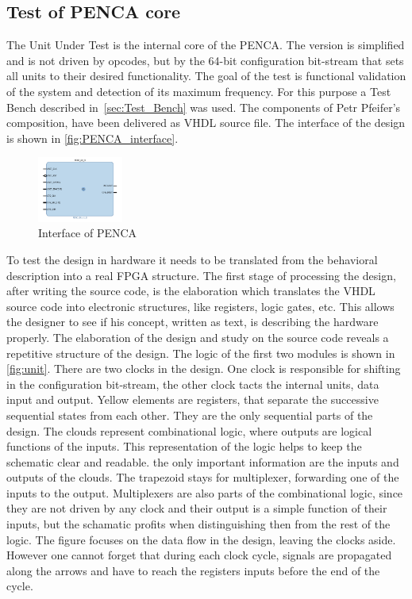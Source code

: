 \subsection{Test of PENCA core}
The Unit Under Test is the internal core of the PENCA. The version is simplified and is not driven by opcodes, but by the 64-bit configuration bit-stream that sets all units to their desired functionality. The goal of the test is functional validation of the system and detection of its maximum frequency. For this purpose a Test Bench described in~\autoref{sec:Test_Bench} was used.
The components of Petr Pfeifer's composition, have been delivered as VHDL source file. The interface of the design is shown in \autoref{fig:PENCA_interface}.

\begin{figure}[h]
\centering
\includegraphics[width=0.25\textwidth]{figures/PENCA_interface.PNG}
\caption{Interface of PENCA}
\label{fig:PENCA_interface}
\end{figure}

To test the design in hardware it needs to be translated from the behavioral description into a real FPGA structure. The first stage of processing the design, after writing the source code, is the elaboration which translates the VHDL source code into electronic structures, like registers, logic gates, etc. This allows the designer to see if his concept, written as text, is describing the hardware properly.
The elaboration of the design and study on the source code reveals a repetitive structure of the design. The logic of the first two modules is shown in \autoref{fig:unit}. There are two clocks in the design. One clock is responsible for shifting in the configuration bit-stream, the other clock tacts the internal units, data input and output. Yellow elements are registers, that separate the successive sequential states from each other. They are the only sequential parts of the design. The clouds represent combinational logic, where outputs are logical functions of the inputs. This representation of the logic helps to keep the schematic clear and readable. the only important information are the inputs and outputs of the clouds. The trapezoid stays for multiplexer, forwarding one of the inputs to the output. Multiplexers are also parts of the combinational logic, since they are not driven by any clock and their output is a simple function of their inputs, but the schamatic profits when distinguishing then from the rest of the logic. The figure focuses on the data flow in the design, leaving the clocks aside. However one cannot forget that during each clock cycle, signals are propagated along the arrows and have to reach the registers inputs before the end of the cycle.

